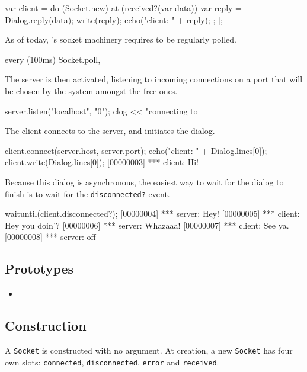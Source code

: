 \begin{urbiscript}
var client =
  do (Socket.new)
  {
    at (received?(var data))
    {
      var reply = Dialog.reply(data);
      write(reply);
      echo("client: " + reply);
    };
  }|;
\end{urbiscript}

As of today, \us's socket machinery requires to be regularly polled.

\begin{urbiscript}
every (100ms)
  Socket.poll,
\end{urbiscript}

The server is then activated, listening to incoming connections on a
port that will be chosen by the system amongst the free ones.

\begin{urbiscript}
server.listen("localhost", "0");
clog << "connecting to %
\end{urbiscript}

The client connects to the server, and initiates the dialog.

\begin{urbiscript}
client.connect(server.host, server.port);
echo("client: " + Dialog.lines[0]);
client.write(Dialog.lines[0]);
[00000003] *** client: Hi!
\end{urbiscript}

Because this dialog is asynchronous, the easiest way to wait for the
dialog to finish is to wait for the \lstinline|disconnected?| event.

\begin{urbiscript}
waituntil(client.disconnected?);
[00000004] *** server: Hey!
[00000005] *** client: Hey you doin'?
[00000006] *** server: Whazaaa!
[00000007] *** client: See ya.
[00000008] *** server: off
\end{urbiscript}

\subsection{Prototypes}
\begin{itemize}
\item {}
\end{itemize}

\subsection{Construction}

A \lstinline|Socket| is constructed with no argument. At creation, a
new \lstinline|Socket| has four own slots: \lstinline|connected|,
\lstinline|disconnected|, \lstinline|error| and \lstinline|received|.

